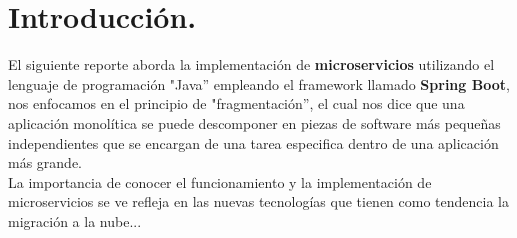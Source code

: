 \section{Introducción.} 
El siguiente reporte aborda la implementación de \textbf{microservicios} utilizando el lenguaje de programación "Java” empleando el framework llamado \textbf{Spring Boot}, nos enfocamos en el principio de "fragmentación”, el cual nos dice que una aplicación monolítica se puede descomponer en piezas de software más pequeñas independientes que se encargan de una tarea especifica dentro de una aplicación más grande.\\

La importancia de conocer el funcionamiento y la implementación de microservicios se ve refleja en las nuevas tecnologías que tienen como tendencia la migración a la nube...



